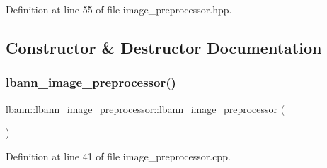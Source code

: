 Definition at line 55 of file image\+\_\+preprocessor.\+hpp.



\subsection{Constructor \& Destructor Documentation}
\mbox{\label{classlbann_1_1lbann__image__preprocessor_a6a0f92194d42e87d73b57ba0929e2b2d}} 
\subsubsection{\texorpdfstring{lbann\+\_\+image\+\_\+preprocessor()}{lbann\_image\_preprocessor()}\hspace{0.1cm}{\footnotesize\ttfamily [1/2]}}
{\footnotesize\ttfamily lbann\+::lbann\+\_\+image\+\_\+preprocessor\+::lbann\+\_\+image\+\_\+preprocessor (\begin{DoxyParamCaption}{ }\end{DoxyParamCaption})}



Definition at line 41 of file image\+\_\+preprocessor.\+cpp.


